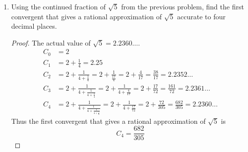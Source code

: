 \documentclass[11pt]{article}
\theoremstyle{definition}
\begin{document}
\begin{enumerate}
\begin{enumerate}
    \end{enumerate}
    \item Using the continued fraction of $\sqrt 5$ from the previous problem, find the first convergent that gives a rational approximation of $\sqrt 5$ accurate to four decimal places.
    \begin{proof}
        The actual value of $\sqrt{5} = 2.2360\dots$.
        \begin{align*}
            C_0 &= 2 \\
            C_1 &= 2 + \frac{1}{4} = 2.25 \\
            C_2 &= 2 + \frac{1}{4 + \frac{1}{4}} =  2 + \frac{1}{\frac{17}{4}} = 2 + \frac{4}{17} = \frac{38}{17} = 2.2352\dots \\
            C_3 &= 2 + \frac{1}{4 + \frac{1}{4 + \frac{1}{4}}} = 2 + \frac{1}{4 + \frac{4}{17}} = 2 + \frac{17}{72} = \frac{161}{72} = 2.2361\dots \\
            C_4 &= 2 + \frac{1}{4 + \frac{1}{4 + \frac{1}{4 + \frac{1}{4}}}} = 2 + \frac{1}{4 + \frac{17}{72}} = 2 + \frac{72}{305} = \frac{682}{305} = 2.2360\dots
        \end{align*}
        Thus the first convergent that gives a rational approximation of $\sqrt{5}$ is 
        \[
            C_4 = \frac{682}{305}
        \]
    \end{proof}

\end{enumerate}
\end{document}
